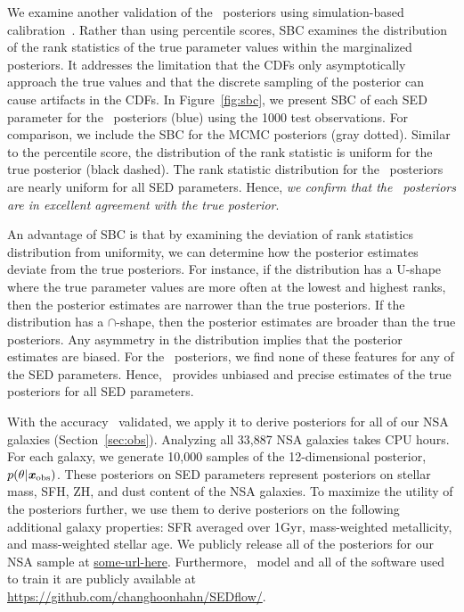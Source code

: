 We examine another validation of the \sedflow~posteriors using simulation-based
calibration~\citep[SBC;][]{talts2020}. 
Rather than using percentile scores, SBC examines the distribution of the rank
statistics of the true parameter values within the marginalized posteriors. 
It addresses the limitation that the CDFs only asymptotically approach the true
values and that the discrete sampling of the posterior can cause artifacts in
the CDFs. 
In Figure~\ref{fig:sbc}, we present SBC of each SED parameter for the
\sedflow~posteriors (blue) using the 1000 test observations.
For comparison, we include the SBC for the MCMC posteriors (gray dotted). 
Similar to the percentile score, the distribution of the rank statistic is
uniform for the true posterior (black dashed). 
The rank statistic distribution for the \sedflow~posteriors are nearly uniform
for all SED parameters. 
Hence, \emph{we confirm that the \sedflow~posteriors are in excellent agreement
with the true posterior}.

An advantage of SBC is that by examining the deviation of rank statistics
distribution from uniformity, we can determine how the posterior estimates
deviate from the true posteriors. 
For instance, if the distribution has a U-shape where the true parameter values
are more often at the lowest and highest ranks, then the posterior estimates
are narrower than the true posteriors.
If the distribution has a $\cap$-shape, then the posterior estimates are
broader than the true posteriors. 
Any asymmetry in the distribution implies that the posterior estimates are
biased.  
For the \sedflow~posteriors, we find none of these features for any of the SED
parameters. 
Hence, \sedflow~provides unbiased and precise estimates of the true posteriors
for all SED parameters. 

With the accuracy \sedflow~validated, we apply it to derive posteriors for all
of our NSA galaxies (Section~\ref{sec:obs}). 
Analyzing all 33,887 NSA galaxies takes  CPU hours. 
For each galaxy, we generate 10,000 samples of the 12-dimensional posterior,
$p(\theta | \textbf{\textit{x}}_{\rm obs})$. 
These posteriors on SED parameters represent posteriors on stellar mass, SFH,
ZH, and dust content of the NSA galaxies. 
To maximize the utility of the posteriors further, we use them to derive
posteriors on the following additional galaxy properties: SFR averaged over
1Gyr, mass-weighted metallicity, and mass-weighted stellar age. 
We publicly release all of the posteriors for our NSA sample at 
\url{some-url-here}. 
Furthermore, \sedflow~model and all of the software used to train it are
publicly available at \url{https://github.com/changhoonhahn/SEDflow/}. 
